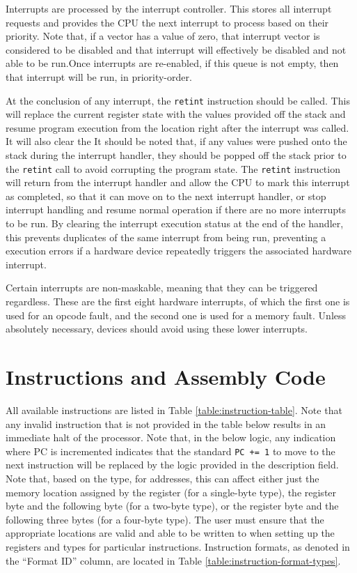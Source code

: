 \documentclass{article}
\begin{document}
Interrupts are processed by the interrupt controller. This stores all interrupt requests and provides the CPU the next interrupt to process based on their priority. Note that, if a vector has a value of zero, that interrupt vector is considered to be disabled and that interrupt will effectively be disabled and not able to be run.Once interrupts are re-enabled, if this queue is not empty, then that interrupt will be run, in priority-order.

At the conclusion of any interrupt, the \texttt{retint} instruction should be called. This will replace the current register state with the values provided off the stack and resume program execution from the location right after the interrupt was called. It will also clear the It should be noted that, if any values were pushed onto the stack during the interrupt handler, they should be popped off the stack prior to the \texttt{retint} call to avoid corrupting the program state. The \texttt{retint} instruction will return from the interrupt handler and allow the CPU to mark this interrupt as completed, so that it can move on to the next interrupt handler, or stop interrupt handling and resume normal operation if there are no more interrupts to be run. By clearing the interrupt execution status at the end of the handler, this prevents duplicates of the same interrupt from being run, preventing a execution errors if a hardware device repeatedly triggers the associated hardware interrupt.

Certain interrupts are non-maskable, meaning that they can be triggered regardless. These are the first eight hardware interrupts, of which the first one is used for an opcode fault, and the second one is used for a memory fault. Unless absolutely necessary, devices should avoid using these lower interrupts.

\pagebreak

\section{Instructions and Assembly Code}
\label{sec:instructions}

All available instructions are listed in Table \ref{table:instruction-table}. Note that any invalid instruction that is not provided in the table below results in an immediate halt of the processor. Note that, in the below logic, any indication where PC is incremented indicates that the standard \texttt{PC += 1} to move to the next instruction will be replaced by the logic provided in the description field. Note that, based on the type, for addresses, this can affect either just the memory location assigned by the register (for a single-byte type), the register byte and the following byte (for a two-byte type), or the register byte and the following three bytes (for a four-byte type). The user must ensure that the appropriate locations are valid and able to be written to when setting up the registers and types for particular instructions. Instruction formats, as denoted in the ``Format ID'' column, are located in Table \ref{table:instruction-format-types}.
\end{document}
